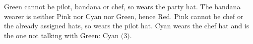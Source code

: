 Green cannot be pilot, bandana or chef, so wears the party hat. The bandana wearer is neither Pink nor Cyan nor Green, hence Red. Pink cannot be chef or the already assigned hats, so wears the pilot hat. Cyan wears the chef hat and is the one not talking with Green: $\boxed{\text{Cyan (3)}}$.
